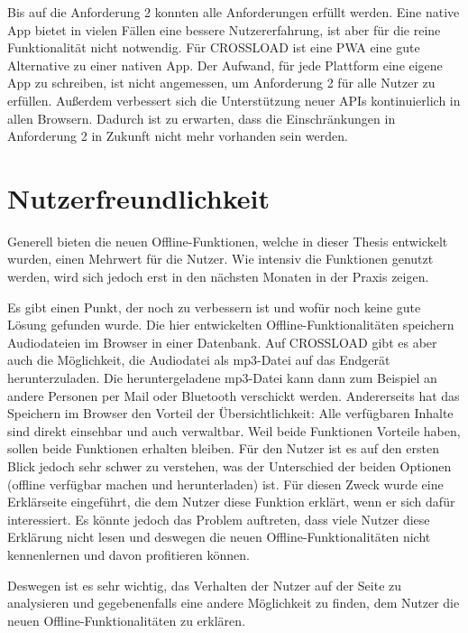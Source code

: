 \clearpage

Bis auf die Anforderung 2 konnten alle Anforderungen erfüllt werden. Eine native App bietet in vielen Fällen eine bessere Nutzererfahrung, ist aber für die reine Funktionalität nicht notwendig. Für CROSSLOAD ist eine \ac{PWA} eine gute Alternative zu einer nativen App. Der Aufwand, für jede Plattform eine eigene App zu schreiben, ist nicht angemessen, um Anforderung 2 für alle Nutzer zu erfüllen. Außerdem verbessert sich die Unterstützung neuer \acp{API} kontinuierlich in allen Browsern. Dadurch ist zu erwarten, dass die Einschränkungen in Anforderung 2 in Zukunft nicht mehr vorhanden sein werden.

\section{Nutzerfreundlichkeit}
Generell bieten die neuen Offline-Funktionen, welche in dieser Thesis entwickelt wurden, einen Mehrwert für die Nutzer. Wie intensiv die Funktionen genutzt werden, wird sich jedoch erst in den nächsten Monaten in der Praxis zeigen. 

Es gibt einen Punkt, der noch zu verbessern ist und wofür noch keine gute Lösung gefunden wurde. Die hier entwickelten Offline-Funktionalitäten speichern Audio\-dateien im Browser in einer Datenbank. Auf CROSSLOAD gibt es aber auch die Möglichkeit, die Audiodatei als mp3-Datei auf das Endgerät herunterzuladen. Die heruntergeladene mp3-Datei kann dann zum Beispiel an andere Personen per Mail oder Bluetooth verschickt werden. Andererseits hat das Speichern im Browser den Vorteil der Übersichtlichkeit: Alle verfügbaren Inhalte sind direkt einsehbar und auch verwaltbar. Weil beide Funktionen Vorteile haben, sollen beide Funktionen erhalten bleiben. Für den Nutzer ist es auf den ersten Blick jedoch sehr schwer zu verstehen, was der Unterschied der beiden Optionen (offline verfügbar machen und herunterladen) ist. Für diesen Zweck wurde eine Erklärseite eingeführt, die dem Nutzer diese Funktion erklärt, wenn er sich dafür interessiert. Es könnte jedoch das Problem auftreten, dass viele Nutzer diese Erklärung nicht lesen und deswegen die neuen Offline-Funktionalitäten nicht kennenlernen und davon profitieren können. 

Deswegen ist es sehr wichtig, das Verhalten der Nutzer auf der Seite zu analysieren und gegebenenfalls eine andere Möglichkeit zu finden, dem Nutzer die neuen Offline-Funktionalitäten zu erklären.
